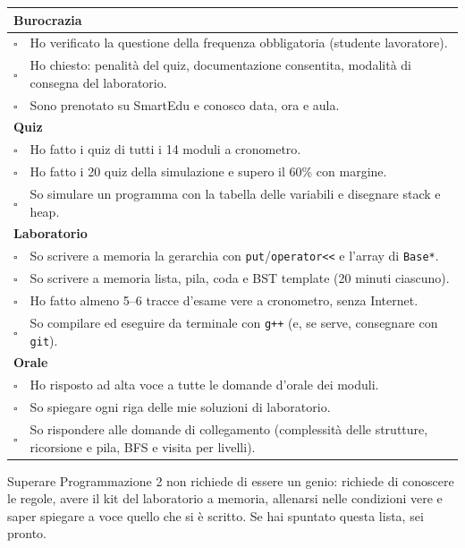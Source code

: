 \begin{center}\small
\begin{tabular}{p{0.5cm}p{12.6cm}}
\toprule
\multicolumn{2}{l}{\textbf{Burocrazia}} \\
\midrule
$\square$ & Ho verificato la questione della frequenza obbligatoria (studente lavoratore). \\
$\square$ & Ho chiesto: penalità del quiz, documentazione consentita, modalità di consegna del laboratorio. \\
$\square$ & Sono prenotato su SmartEdu e conosco data, ora e aula. \\
\midrule
\multicolumn{2}{l}{\textbf{Quiz}} \\
\midrule
$\square$ & Ho fatto i quiz di tutti i 14 moduli a cronometro. \\
$\square$ & Ho fatto i 20 quiz della simulazione e supero il 60\% con margine. \\
$\square$ & So simulare un programma con la tabella delle variabili e disegnare stack e heap. \\
\midrule
\multicolumn{2}{l}{\textbf{Laboratorio}} \\
\midrule
$\square$ & So scrivere a memoria la gerarchia con \texttt{put}/\texttt{operator<<} e l'array di \texttt{Base*}. \\
$\square$ & So scrivere a memoria lista, pila, coda e BST template (20 minuti ciascuno). \\
$\square$ & Ho fatto almeno 5--6 tracce d'esame vere a cronometro, senza Internet. \\
$\square$ & So compilare ed eseguire da terminale con \texttt{g++} (e, se serve, consegnare con \texttt{git}). \\
\midrule
\multicolumn{2}{l}{\textbf{Orale}} \\
\midrule
$\square$ & Ho risposto ad alta voce a tutte le domande d'orale dei moduli. \\
$\square$ & So spiegare ogni riga delle mie soluzioni di laboratorio. \\
$\square$ & So rispondere alle domande di collegamento (complessità delle strutture, ricorsione e pila, BFS e visita per livelli). \\
\bottomrule
\end{tabular}
\end{center}

\begin{inparole}
Superare Programmazione 2 non richiede di essere un genio: richiede di conoscere le
regole, avere il kit del laboratorio a memoria, allenarsi nelle condizioni vere e
saper spiegare a voce quello che si è scritto. Se hai spuntato questa lista, sei pronto.
\end{inparole}
